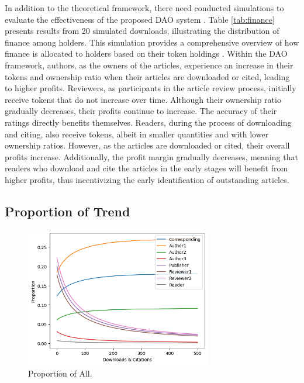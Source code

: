 \documentclass[lettersize,journal]{IEEEtran}
\begin{document}
In addition to the theoretical framework, there need conducted simulations to evaluate the effectiveness of the proposed DAO system \cite{macal2009agent}. Table \ref{tab:finance} presents results from 20 simulated downloads, illustrating the distribution of finance among holders. This simulation provides a comprehensive overview of how finance is allocated to holders based on their token holdings \cite{liu2023incremental}.
Within the DAO framework, authors, as the owners of the articles, experience an increase in their tokens and ownership ratio when their articles are downloaded or cited, leading to higher profits. Reviewers, as participants in the article review process, initially receive tokens that do not increase over time. Although their ownership ratio gradually decreases, their profits continue to increase. The accuracy of their ratings directly benefits themselves. Readers, during the process of downloading and citing, also receive tokens, albeit in smaller quantities and with lower ownership ratios. However, as the articles are downloaded or cited, their overall profits increase. Additionally, the profit margin gradually decreases, meaning that readers who download and cite the articles in the early stages will benefit from higher profits, thus incentivizing the early identification of outstanding articles.


\subsection{Proportion of Trend}


\begin{figure}[h]
  \centering
  \includegraphics[width=3.2in]{assets/proportion-all.png}
  \caption{Proportion of All.}
  \label{fig:proportion-all}
\end{figure}
\end{document}
